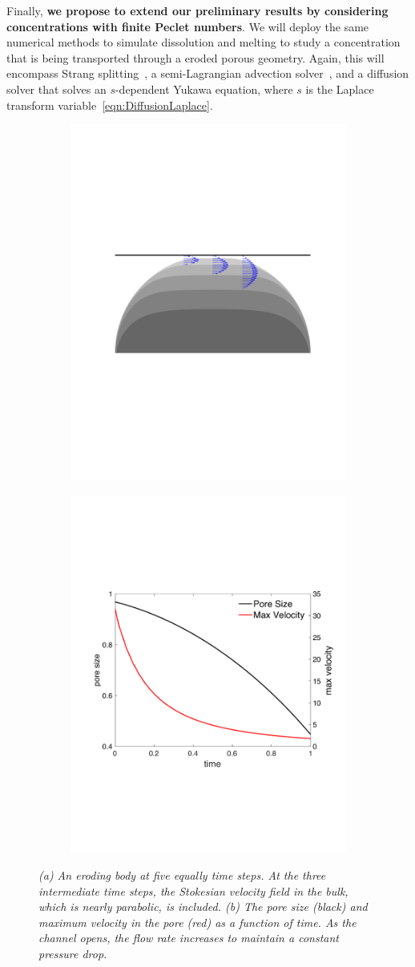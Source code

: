 \documentclass[11pt]{article}
\begin{document}
Finally, {\bf we propose to extend our preliminary results by
considering concentrations with finite Peclet numbers}. We will deploy
the same numerical methods to simulate dissolution and melting to study
a concentration that is being transported through a eroded porous
geometry. Again, this will encompass Strang splitting~\cite{str1968}, a
semi-Lagrangian advection solver~\cite{rob1981}, and a diffusion solver
that solves an $s$-dependent Yukawa equation, where $s$ is the Laplace
transform variable~\eqref{eqn:DiffusionLaplace}.

\begin{figure}[htp]
  \centering
  \begin{subfigure}[b]{0.47\textwidth}
  \begin{center}
  \includegraphics[height=0.55\textwidth]{figs/porelets_geom}
  \end{center}
  \caption{}
  \end{subfigure}
  \begin{subfigure}[b]{0.47\textwidth}
  \begin{center}
  \includegraphics[height=0.55\textwidth]{figs/porelets_size}
  \end{center}
  \caption{}
  \end{subfigure}
  \caption{\label{fig:porelets} \em (a) An eroding body at five equally time steps.  At the three intermediate time steps, the Stokesian velocity field in the bulk, which is nearly parabolic, is included. (b) The pore size (black) and maximum velocity in the pore (red) as a function of time.  As the channel opens, the flow rate increases to maintain a constant pressure drop.} 
\end{figure}
\end{document}
